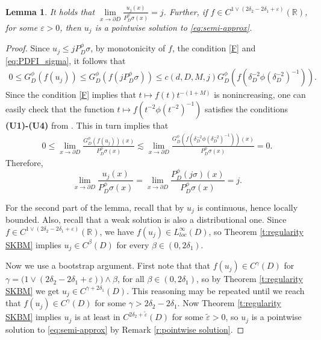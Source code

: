 \documentclass[12pt,a4paper,onecolumn]{amsart}
\newtheorem{lem}[thm]{Lemma}
\theoremstyle{definition}
\newcommand{\R}{\mathbb{R}}
\newcommand{\1}{\mathbf 1}
\newcommand{\GDfi}{G^\phi_{ D}}
\newcommand{\GDFI}{\GDfi}
\newcommand{\PDfi}{P^\phi_{ D}}
\newcommand{\PDFI}{\PDfi}
\newcommand{\de}{\delta_D}
\newcommand{\wt}{\widetilde}
\numberwithin{equation}{section}
\begin{document}
\begin{lem}\label{l:approx sol. point.}
	It holds that $\lim\limits_{x\to\partial D}\frac{u_j(x)}{\PDFI\sigma(x)}=j$. Further, if {$f\in C^{1\vee (2\delta_2-2\delta_1+\varepsilon)}(\R)$, for some $\varepsilon>0$,  then $u_j$ is a pointwise solution to \eqref{eq:semi-approx}.}
\end{lem}
\begin{proof}
	
	
	Since $u_j\le j \PDFI\sigma$, by monotonicity of $f$, the condition \ref{F} and \eqref{eq:PDFI_sigma}, it follows that \begin{align*}
		0\le \GDFI\left(f(u_j)\right)\le \GDFI(f(j\PDFI\sigma))\le c(d,D, M, j) \GDFI\left(f(\de^{-2}\phi(\de^{-2})^{-1})\right).
	\end{align*}
	Since the condition \ref{F} implies that $t\mapsto f(t)t^{-(1+M)}$ is nonincreasing, one can easily check that the function $t\mapsto f(t^{-2}\phi(t^{-2})^{-1})$ satisfies the conditions \textbf{(U1)-(U4)} from \cite[Theorem 3.6]{Bio23}. This in turn implies that
	\begin{align*}
		0\le\lim_{x\to\partial D}\frac{\GDFI\left(f(u_j)\right)(x)}{\PDFI\sigma(x)}\lesssim \lim_{x\to\partial D}\frac{\GDFI\left(f(\de^{-2}\phi(\de^{-2})^{-1})\right)(x)}{\PDFI\sigma(x)}=0.
	\end{align*}
	Therefore,
	$$\lim_{x\to\partial D}\frac{u_j(x)}{\PDFI\sigma(x)}=\lim_{x\to\partial D}\frac{\PDFI(j\sigma)(x)}{\PDFI\sigma(x)}=j.$$
    
For the second part of the lemma, recall that by \cite[Theorem 5.10]{Bio23} $u_j$ is continuous, hence locally bounded. Also, recall that a weak solution is also a distributional one. Since {$f\in C^{1\vee (2\delta_2-2\delta_1+\varepsilon)}(\R)$}, we have $f(u_j)\in L^\infty_{loc}(D)$, so Theorem \ref{t:regularity SKBM} implies $u_j\in C^\beta(D)$ for every $\beta\in(0,2\delta_1)$. 


{
Now we use a bootstrap argument. First note that that $f(u_j)\in C^{\gamma}(D)$ for $\gamma=\big(1\vee (2\delta_2-2\delta_1+\varepsilon)\big)\wedge \beta$, for all $\beta\in(0,2\delta_1)$, so by Theorem \ref{t:regularity SKBM}  we get $u_j\in C^{\gamma+2\delta_1}(D)$. This reasoning may be repeated until we reach that $f(u_j)\in C^{\gamma}(D)$ for some $\gamma>2\delta_2-2\delta_1$. Now Theorem \ref{t:regularity SKBM} implies $u_j$ is at least in $C^{2\delta_2+\wt\varepsilon}(D)$ for some $\wt \varepsilon>0$, so $u_j$ is a pointwise solution to \eqref{eq:semi-approx} by Remark \ref{r:pointwise solution}.}

\end{proof}
\end{document}
